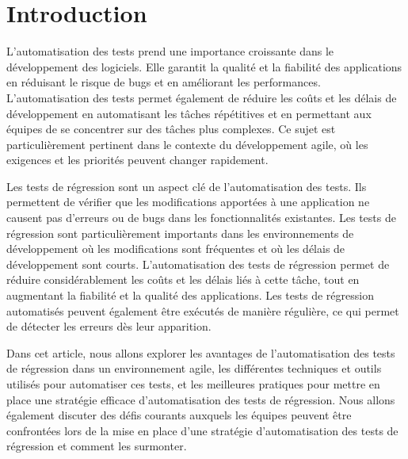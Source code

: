 \chapter{Introduction}
\label{chap:intro}


L'automatisation des tests prend une importance croissante dans le développement des logiciels. Elle garantit la qualité et la fiabilité des applications en réduisant le risque de bugs et en améliorant les performances. L'automatisation des tests permet également de réduire les coûts et les délais de développement en automatisant les tâches répétitives et en permettant aux équipes de se concentrer sur des tâches plus complexes. Ce sujet est particulièrement pertinent dans le contexte du développement agile, où les exigences et les priorités peuvent changer rapidement.


Les tests de régression sont un aspect clé de l'automatisation des tests. Ils permettent de vérifier que les modifications apportées à une application ne causent pas d'erreurs ou de bugs dans les fonctionnalités existantes. Les tests de régression sont particulièrement importants dans les environnements de développement où les modifications sont fréquentes et où les délais de développement sont courts. L'automatisation des tests de régression permet de réduire considérablement les coûts et les délais liés à cette tâche, tout en augmentant la fiabilité et la qualité des applications. Les tests de régression automatisés peuvent également être exécutés de manière régulière, ce qui permet de détecter les erreurs dès leur apparition.

Dans cet article, nous allons explorer les avantages de l'automatisation des tests de régression dans un environnement agile, les différentes techniques et outils utilisés pour automatiser ces tests, et les meilleures pratiques pour mettre en place une stratégie efficace d'automatisation des tests de régression. Nous allons également discuter des défis courants auxquels les équipes peuvent être confrontées lors de la mise en place d'une stratégie d'automatisation des tests de régression et comment les surmonter.
\parencite{classification}